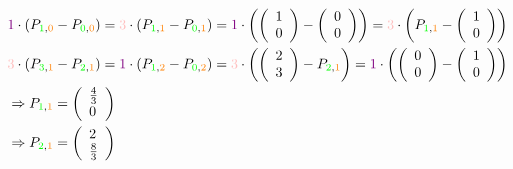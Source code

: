 $$
\begin{aligned}
    &\textcolor{violet}{1} \cdot \left(P_{\textcolor{green}{1}, \textcolor{orange}{0}}-P_{\textcolor{green}{0}, \textcolor{orange}{0}}\right)=\textcolor{pink}{3} \cdot \left(P_{\textcolor{green}{1}, \textcolor{orange}{1}}-P_{\textcolor{green}{0}, \textcolor{orange}{1}}\right)=\textcolor{violet}{1}\cdot \left(\left(\begin{array}{l} 1 \\ 0 \end{array}\right)-\left(\begin{array}{l} 0 \\ 0 \end{array}\right)\right)=\textcolor{pink}{3}\cdot\left(P_{\textcolor{green}{1}, \textcolor{orange}{1}}-\left(\begin{array}{l} 1 \\ 0 \end{array}\right)\right)\\
    & \textcolor{pink}{3} \cdot \left(P_{\textcolor{green}{3}, \textcolor{orange}{1}}-P_{\textcolor{green}{2}, \textcolor{orange}{1}}\right)=\textcolor{violet}{1}\cdot\left(P_{\textcolor{green}{1}, \textcolor{orange}{2}}-P_{\textcolor{green}{0}, \textcolor{orange}{2}}\right)=\textcolor{pink}{3}\cdot \left(\left(\begin{array}{l} 2 \\ 3 \end{array}\right)-P_{\textcolor{green}{2}, \textcolor{orange}{1}}\right)=\textcolor{violet}{1}\cdot\left(\left(\begin{array}{l} 0 \\ 0 \end{array}\right)-\left(\begin{array}{l} 1 \\ 0 \end{array}\right)\right)\\
    &\Rightarrow P_{\textcolor{green}{1}, \textcolor{orange}{1}}=\left(\begin{array}{l} \frac{4}{3} \\ 0 \end{array}\right)\\
    &\Rightarrow P_{\textcolor{green}{2}, \textcolor{orange}{1}}=\left(\begin{array}{l} 2 \\ \frac{8}{3} \end{array}\right)
\end{aligned}
$$
